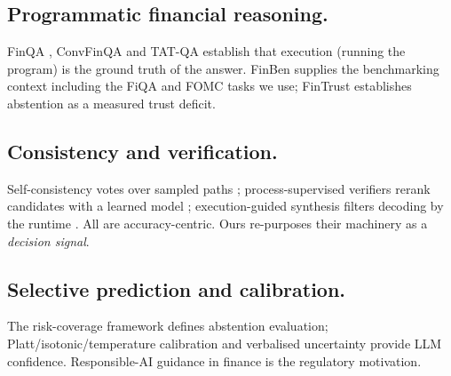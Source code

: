 \documentclass[conference]{IEEEtran}
\begin{document}
\subsection{Programmatic financial reasoning.}
FinQA \citep{chen2021finqa}, ConvFinQA \citep{chen2022convfinqa} and TAT-QA
\citep{zhu2021tatqa} establish that execution (running the program) is the ground truth of
the answer. FinBen \citep{xie2024finben} supplies the benchmarking context including the
FiQA and FOMC tasks we use; FinTrust \citep{hu2025fintrust} establishes abstention as a
measured trust deficit.

\subsection{Consistency and verification.}
Self-consistency votes over sampled paths \citep{wang2023selfconsistency}; process-supervised
verifiers rerank candidates with a learned model \citep{lightman2024verify,wang2024mathshepherd};
execution-guided synthesis filters decoding by the runtime \citep{chen2019execution}.
All are accuracy-centric. Ours re-purposes their machinery as a \emph{decision signal}.

\subsection{Selective prediction and calibration.}
The risk-coverage framework \citep{eliyaniv2010selective,geifman2017selective,geifman2019selectivenet}
defines abstention evaluation; Platt/isotonic/temperature calibration
\citep{platt1999platt,zadrozny2002isotonic,guo2017calibration} and verbalised uncertainty
\citep{lin2022uncertainty} provide LLM confidence. Responsible-AI guidance in finance
\citep{fritzmorgenthal2022risk} is the regulatory motivation.
\end{document}
